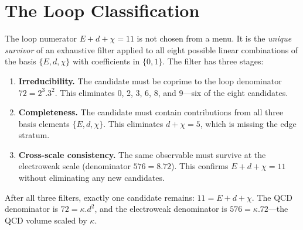 \documentclass[11pt,a4paper]{book}
\def\cdot{.}%
\begin{document}
\section{The Loop Classification}

The loop numerator $E + d + \chi = 11$ is not chosen from a menu. It is the \emph{unique survivor} of an exhaustive filter applied to all eight possible linear combinations of the basis $\{E, d, \chi\}$ with coefficients in $\{0, 1\}$. The filter has three stages:

\begin{enumerate}
\item \textbf{Irreducibility.} The candidate must be coprime to the loop denominator $72 = 2^3 \cdot 3^2$. This eliminates 0, 2, 3, 6, 8, and 9---six of the eight candidates.

\item \textbf{Completeness.} The candidate must contain contributions from all three basis elements $\{E, d, \chi\}$. This eliminates $d + \chi = 5$, which is missing the edge stratum.

\item \textbf{Cross-scale consistency.} The same observable must survive at the electroweak scale (denominator $576 = 8 \cdot 72$). This confirms $E + d + \chi = 11$ without eliminating any new candidates.
\end{enumerate}

After all three filters, exactly one candidate remains: $11 = E + d + \chi$. The QCD denominator is $72 = \kappa \cdot d^2$, and the electroweak denominator is $576 = \kappa \cdot 72$---the QCD volume scaled by $\kappa$.
\end{document}
